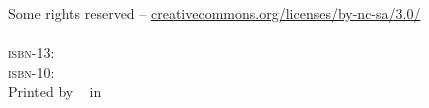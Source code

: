 %

\frontmatter
\pagestyle{titlestyle}
\hypersetup{pageanchor=false}
\setlrmarginsandblock{2cm}{2cm}{*}
\setulmarginsandblock{2cm}{2cm}{*}
\checkandfixthelayout
\makeatletter
\ch@ngetext
\makeatletter
\clearpage




\cleardoublepage


\vspace*{\fill}
\begin{center}
{
  {\Huge \thesistitle }\\[0.5cm]
  {\huge ~\thesissubtitle~ }\\
}
\end{center}
\vspace*{\fill}
\vspace*{\fill}
\clearpage

\vspace*{\fill}
\ccbyncsa\ \thesisyear\ \thesisauthor\\
Some rights reserved -- \url{creativecommons.org/licenses/by-nc-sa/3.0/}\\

\thesisonline\\

\textsc{isbn-13}: \href{http://www.google.com/?q=\thesisisbna}{\thesisisbna}\\
\textsc{isbn-10}: \href{http://www.google.com/?q=\thesisisbnb}{\thesisisbnb}\\

\ifdefined\thesisprinter
Printed by \thesisprinter\
\fi
\ifdefined\thesisprintloc
in \thesisprintloc\\
\fi

